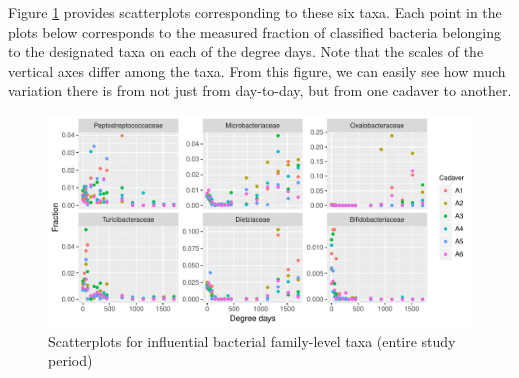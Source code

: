 \documentclass{article}
\begin{document}
Figure \ref{fig:infl_bac_family_scatter} provides scatterplots
corresponding to these six taxa.  Each point in the plots below
corresponds to the measured fraction of classified bacteria belonging
to the designated taxa on each of the degree days.  Note that the
scales of the vertical axes differ among the taxa.  From this figure,
we can easily see how much variation there is from not just from
day-to-day, but from one cadaver to another.
\begin{figure}
  \centering
  \includegraphics[width=6.5in]{../revise_algorithm/only_families/all_time_steps/hit_1perc_twice/infl_bac_family_all_data_scatter}
  \caption{Scatterplots for influential bacterial family-level taxa (entire study period)}
  \label{fig:infl_bac_family_scatter}
\end{figure}
\end{document}
